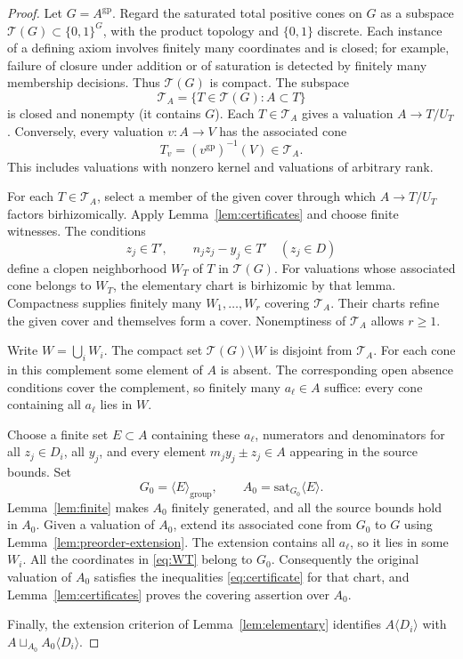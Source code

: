 \documentclass[11pt]{article}
\theoremstyle{definition}
\theoremstyle{remark}
\newcommand{\gp}{\mathrm{gp}}
\newcommand{\sat}{\mathrm{sat}}
\newcommand{\cT}{\mathcal T}
\begin{document}
\begin{proof}
Let $G=A^{\gp}$. Regard the saturated total positive cones on $G$ as a subspace $\cT(G)\subset\{0,1\}^G$, 
with the product topology and $\{0,1\}$ discrete. Each instance of a defining axiom involves finitely many coordinates and is closed; for example, failure of closure under addition or of saturation is detected by finitely many membership decisions. Thus $\cT(G)$ is compact. The subspace
\[
 \cT_A=\{T\in\cT(G):A\subset T\}
\]
is closed and nonempty (it contains $G$). Each $T\in\cT_A$ gives a valuation $A\to T/U_T$. Conversely, every valuation $v:A\to V$ has the associated cone
\[
 T_v=(v^{\gp})^{-1}(V)\in\cT_A.
\]
This includes valuations with nonzero kernel and valuations of arbitrary rank.

For each $T\in\cT_A$, select a member of the given cover through which $A\to T/U_T$ factors birhizomically. Apply Lemma~\ref{lem:certificates} and choose finite witnesses. The conditions
\begin{equation}\label{eq:WT}
 z_j\in T',\qquad n_jz_j-y_j\in T'
 \quad(z_j\in D)
\end{equation}
define a clopen neighborhood $W_T$ of $T$ in $\cT(G)$. For valuations whose associated cone belongs to $W_T$, the elementary chart is birhizomic by that lemma. Compactness supplies finitely many $W_1,\ldots,W_r$ covering $\cT_A$. Their charts refine the given cover and themselves form a cover. Nonemptiness of $\cT_A$ allows $r\geq1$.

Write $W=\bigcup_iW_i$. The compact set $\cT(G)\setminus W$ is disjoint from $\cT_A$. For each cone in this complement some element of $A$ is absent. The corresponding open absence conditions cover the complement, so finitely many $a_\ell\in A$ suffice: every cone containing all $a_\ell$ lies in $W$.

Choose a finite set $E\subset A$ containing these $a_\ell$, numerators and denominators for all $z_j\in D_i$, all $y_j$, and every element $m_jy_j\pm z_j\in A$ appearing in the source bounds. Set
\[
 G_0=\langle E\rangle_{\mathrm{group}},\qquad
 A_0=\sat_{G_0}\langle E\rangle.
\]
Lemma~\ref{lem:finite} makes $A_0$ finitely generated, and all the source bounds hold in $A_0$. Given a valuation of $A_0$, extend its associated cone from $G_0$ to $G$ using Lemma~\ref{lem:preorder-extension}. The extension contains all $a_\ell$, so it lies in some $W_i$. All the coordinates in \eqref{eq:WT} belong to $G_0$. Consequently the original valuation of $A_0$ satisfies the inequalities \eqref{eq:certificate} for that chart, and Lemma~\ref{lem:certificates} proves the covering assertion over $A_0$.

Finally, the extension criterion of Lemma~\ref{lem:elementary} identifies $A\langle D_i\rangle$ with $A\sqcup_{A_0}A_0\langle D_i\rangle$.
\end{proof}
\end{document}

